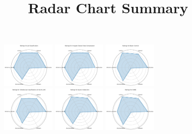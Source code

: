 \documentclass{article}
\title{Radar Chart Summary}
\date{}
\begin{document}
\maketitle

\begin{figure}[ht!]
\centering
\includegraphics[width=0.2333\textwidth]{Jet Classification_radar.pdf}
\includegraphics[width=0.2333\textwidth]{Irregular Sensor Data Compression_radar.pdf}
\includegraphics[width=0.2333\textwidth]{Beam Control_radar.pdf}
\\[1ex]
\includegraphics[width=0.2333\textwidth]{Ultrafast jet classification at the HL-LHC_radar.pdf}
\includegraphics[width=0.2333\textwidth]{Quench detection_radar.pdf}
\includegraphics[width=0.2333\textwidth]{DUNE_radar.pdf}

\end{figure}
\end{document}
